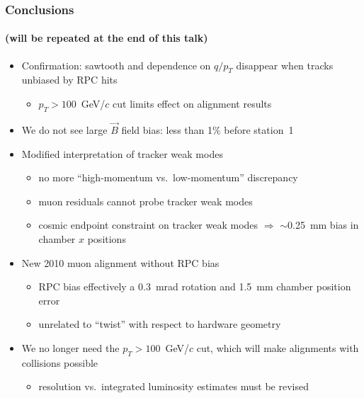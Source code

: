 \documentclass[compress]{beamer}
\begin{document}
\begin{frame}
\frametitle{Conclusions}
\framesubtitle{(will be repeated at the end of this talk)}
\begin{itemize}
\item Confirmation: sawtooth and dependence on $q/p_T$ disappear when tracks unbiased by RPC hits
\begin{itemize}
\item $p_T > 100$~GeV/$c$ cut limits effect on alignment results
\end{itemize}

\item We do not see large $\vec{B}$ field bias: less than 1\% before station~1

\item Modified interpretation of tracker weak modes
\begin{itemize}
\item no more ``high-momentum vs.\ low-momentum'' discrepancy
\item muon residuals cannot probe tracker weak modes
\item cosmic endpoint constraint on tracker weak modes $\Rightarrow$
  $\sim$0.25~mm bias in chamber $x$ positions
\end{itemize}

\item New 2010 muon alignment without RPC bias
\begin{itemize}
\item RPC bias effectively a 0.3~mrad rotation and 1.5~mm chamber position error
\item unrelated to ``twist'' with respect to hardware geometry
\end{itemize}

\item We no longer need the $p_T > 100$~GeV/$c$ cut, which will make alignments with collisions possible
\begin{itemize}
\item resolution vs.\ integrated luminosity estimates must be revised
\end{itemize}
\end{itemize}
\end{frame}
\end{document}
